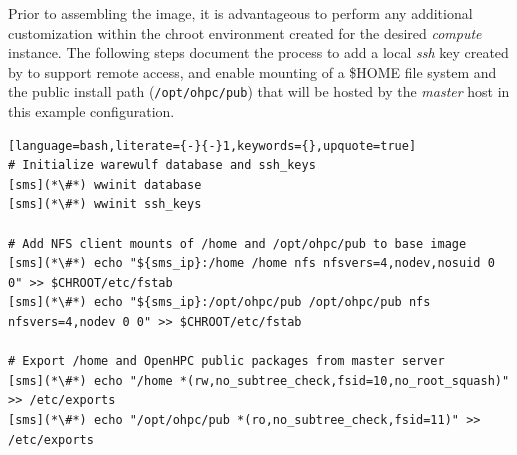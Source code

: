 Prior to assembling the image, it is advantageous to perform any additional
customization within the chroot environment created for the desired {\em
 compute} instance. The following steps document the process to add a local
{\em ssh} key created by \Warewulf{} to support remote access,
and enable \NFS{}
mounting of a \$HOME file system and the public \OHPC{} install path
(\texttt{/opt/ohpc/pub}) that will be hosted by the {\em master} host in this
example configuration.

\begin{lstlisting}[language=bash,literate={-}{-}1,keywords={},upquote=true]
# Initialize warewulf database and ssh_keys
[sms](*\#*) wwinit database
[sms](*\#*) wwinit ssh_keys

# Add NFS client mounts of /home and /opt/ohpc/pub to base image
[sms](*\#*) echo "${sms_ip}:/home /home nfs nfsvers=4,nodev,nosuid 0 0" >> $CHROOT/etc/fstab
[sms](*\#*) echo "${sms_ip}:/opt/ohpc/pub /opt/ohpc/pub nfs nfsvers=4,nodev 0 0" >> $CHROOT/etc/fstab

# Export /home and OpenHPC public packages from master server
[sms](*\#*) echo "/home *(rw,no_subtree_check,fsid=10,no_root_squash)" >> /etc/exports
[sms](*\#*) echo "/opt/ohpc/pub *(ro,no_subtree_check,fsid=11)" >> /etc/exports
\end{lstlisting}

